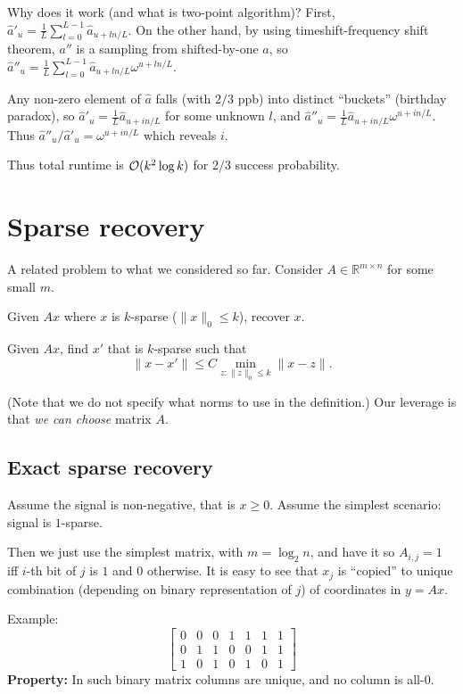 \documentclass[11pt]{article}
\begin{document}
Why does it work (and what is two-point algorithm)?
First, $\hat{a}'_u = \frac1L\sum_{l=0}^{L-1} \hat{a}_{u + l n/L}$. On the other hand, by using timeshift-frequency shift theorem, $a''$ is a sampling from shifted-by-one $a$, so $\hat{a}''_u = \frac1L\sum_{l=0}^{L-1} \hat{a}_{u+ln/L} \omega^{u+ln/L}$.


Any non-zero element of $\hat{a}$ falls (with $2/3$ ppb) into distinct ``buckets'' (birthday paradox), so $\hat{a}'_u = \frac1L\hat{a}_{u+ in/L}$ for some unknown $l$, and $\hat{a}''_u = \frac1L\hat{a}_{u+in/L} \omega^{u+in/L}$. Thus
$\hat{a}''_u / \hat{a}'_u = \omega^{u+in/L}$ which reveals $i$.

Thus total runtime is $\mathcal{O}(k^2 \log k)$ for $2/3$ success probability.

\section{Sparse recovery \cite{DBLP:journals/pieee/GilbertI10}}
A related problem to what we considered so far. Consider $A \in \mathbb{R}^{m \times n}$ for some small $m$.

\begin{definition}
Given $Ax$ where $x$ is $k$-sparse ($\|x\|_0 \le k$), recover $x$.
\end{definition}

\begin{definition}
Given $Ax$, find $x'$ that is $k$-sparse such that
$$\|x - x'\| \le C \min_{z : \|z\|_0 \le k} \|x - z\|.$$
\end{definition}
(Note that we do not specify what norms to use in the definition.)
Our leverage is that \emph{we can choose} matrix $A$.

\subsection{Exact sparse recovery}
Assume the signal is non-negative, that is $x \ge 0$. Assume the simplest scenario: signal is $1$-sparse.

Then we just use the simplest matrix, with $m = \log_2 n$, and have it so $A_{i,j} = 1$ iff $i$-th bit of $j$ is $1$ and $0$ otherwise. It is easy to see that $x_j$ is ``copied'' to unique combination (depending on binary representation of $j$) of coordinates in $y = Ax$.

Example:
$$\begin{bmatrix} 0 & 0 & 0 & 1 & 1 & 1 & 1 \\ 0 & 1 & 1 & 0 & 0 & 1 & 1 \\ 1 & 0 & 1 & 0 & 1 & 0 & 1 \end{bmatrix}
$$
\textbf{Property:} In such binary matrix columns are unique, and no column is all-0.
\end{document}
